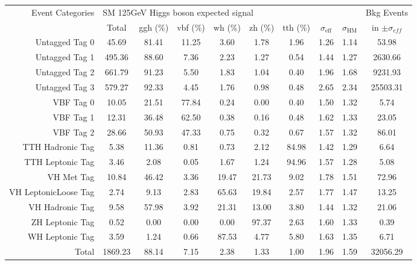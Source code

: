   \begin{tabular}{ |r | c | c | c  | c |  c |  c |  c |  c |  c | }
  \hline
  \hline
  \hline
  \multirow{2}{*}{Event Categories} &\multicolumn{8}{|l|}{SM 125GeV Higgs boson expected signal} & Bkg Events\\ \cline{2-9}
    &  Total & ggh (\%) & vbf (\%) & wh (\%) & zh (\%) & tth (\%) &   $\sigma_{\text{eff}} $  & $\sigma_{\text{HM}} $ & in $ \pm \sigma_{eff}$  \\
    \hline
    \hline
    Untagged Tag 0 &    45.69  &  81.41  &  11.25  &  3.60  &  1.78  &  1.96 & 1.26 & 1.14 & 53.98 \\
    Untagged Tag 1 &    495.36  &  88.60  &  7.36  &  2.23  &  1.27  &  0.54 & 1.44 & 1.27 & 2630.66 \\
    Untagged Tag 2 &    661.79  &  91.23  &  5.50  &  1.83  &  1.04  &  0.40 & 1.96 & 1.68 & 9231.93 \\
    Untagged Tag 3 &    579.27  &  92.33  &  4.45  &  1.76  &  0.98  &  0.48 & 2.65 & 2.34 & 25503.31 \\
    VBF Tag 0 &    10.05  &  21.51  &  77.84  &  0.24  &  0.00  &  0.40 & 1.50 & 1.32 & 5.74 \\
    VBF Tag 1 &    12.31  &  36.48  &  62.50  &  0.38  &  0.16  &  0.48 & 1.62 & 1.33 & 23.05 \\
    VBF Tag 2 &    28.66  &  50.93  &  47.33  &  0.75  &  0.32  &  0.67 & 1.57 & 1.32 & 86.01 \\
    TTH Hadronic Tag &    5.38  &  11.36  &  0.81  &  0.73  &  2.12  &  84.98 & 1.42 & 1.29 & 6.64 \\
    TTH Leptonic Tag &    3.46  &  2.08  &  0.05  &  1.67  &  1.24  &  94.96 & 1.57 & 1.28 & 5.08 \\
    VH Met Tag &    10.84  &  46.42  &  3.36  &  19.47  &  21.73  &  9.02 & 1.78 & 1.51 & 72.96 \\
    VH LeptonicLoose Tag &    2.74  &  9.13  &  2.83  &  65.63  &  19.84  &  2.57 & 1.77 & 1.47 & 13.25 \\
    VH Hadronic Tag &    9.58  &  57.98  &  3.92  &  21.31  &  13.00  &  3.80 & 1.44 & 1.32 & 21.06 \\
    ZH Leptonic Tag &    0.52  &  0.00  &  0.00  &  0.00  &  97.37  &  2.63 & 1.60 & 1.33 & 0.39 \\
    WH Leptonic Tag &    3.59  &  1.24  &  0.66  &  87.53  &  4.77  &  5.80 & 1.63 & 1.35 & 6.71 \\
    Total &    1869.23  &  88.14  &  7.15  &  2.38  &  1.33  &  1.00 & 1.96 & 1.59 & 32056.29 \\
    \hline
    \hline
    \end{tabular}
